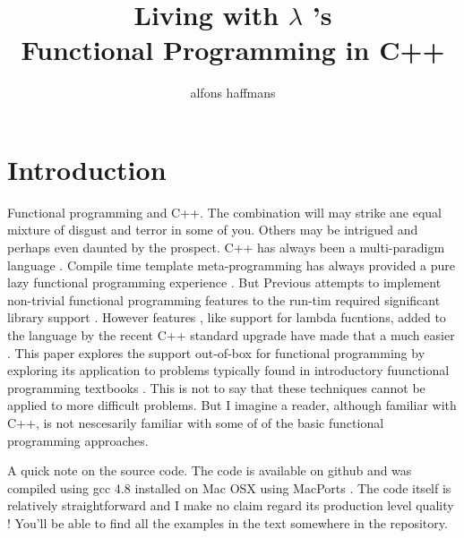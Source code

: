 \documentclass[12pt,fleqn]{article}
\begin{document}
\title{Living  with $\lambda$ 's \\ Functional Programming in C++}
\author {alfons haffmans}
\maketitle

\section* {Introduction}
Functional programming and C++.
The combination will may strike ane equal mixture of disgust and terror in some of you.
Others may be intrigued and perhaps even daunted by the prospect.
C++ has always been a multi-paradigm language \cite{stroustrup}.
Compile time template meta-programming has always provided a pure lazy functional programming experience \cite{vandevoorde, alexan}.
But Previous attempts to implement non-trivial functional programming features to the run-tim required significant  library support \cite{mcnamara}.
However features , like support for lambda fucntions, added to the language by the recent C++ standard upgrade have made that a much easier \cite{josuttis}.
This paper explores the support out-of-box for functional programming by exploring its application to problems typically found in introductory fuunctional programming textbooks \cite{lipovaca, hutton, bird}.
This is not to say that these techniques cannot be applied to more difficult problems.
But I imagine a reader, although familiar with C++, is not nescesarily familiar with some of of the basic functional programming approaches.

A quick note on the source code. 
The code is available on github \cite{sourcecode} and was compiled using gcc 4.8 installed on Mac OSX using MacPorts \cite{macports}.
The code itself is relatively straightforward and I make no claim regard its production level quality !
You'll be able to find all the examples in the text somewhere in the repository.

\end{document}
